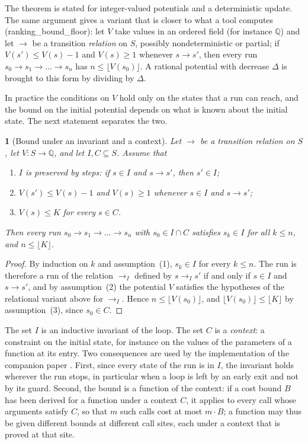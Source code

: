 \documentclass[oneside,english]{amsart}
\numberwithin{equation}{section}
\numberwithin{figure}{section}
\theoremstyle{plain}
\theoremstyle{definition}
\theoremstyle{plain}
\newtheorem{prop}[thm]{\protect\propositionname}
\theoremstyle{remark}
\theoremstyle{plain}
\theoremstyle{definition}
\theoremstyle{plain}
\theoremstyle{remark}
\newcommand{\lean}[1]{{\ttfamily\small #1}}
\providecommand{\propositionname}{Proposition}
\begin{document}
The theorem is stated for integer-valued potentials and a deterministic update. The same argument gives a variant that is closer to what a tool computes (\lean{ranking\_\allowbreak bound\_\allowbreak floor}): let $V$ take values in an ordered field (for instance $\mathbb{Q}$) and let $\to$ be a transition \emph{relation} on $S$, possibly nondeterministic or partial; if $V(s') \le V(s) - 1$ and $V(s) \ge 1$ whenever $s \to s'$, then every run $s_0 \to s_1 \to \dots \to s_n$ has $n \le \lfloor V(s_0) \rfloor$. A rational potential with decrease $\Delta$ is brought to this form by dividing by $\Delta$.

In practice the conditions on $V$ hold only on the states that a run can reach, and the bound on the initial potential depends on what is known about the initial state. The next statement separates the two.

\begin{prop}[Bound under an invariant and a context]
\label{prop:context-bound}
Let $\to$ be a transition relation on $S$, let $V : S \to \mathbb{Q}$, and let $I, C \subseteq S$. Assume that
\begin{enumerate}
    \item $I$ is preserved by steps: if $s \in I$ and $s \to s'$, then $s' \in I$;
    \item $V(s') \le V(s) - 1$ and $V(s) \ge 1$ whenever $s \in I$ and $s \to s'$;
    \item $V(s) \le K$ for every $s \in C$.
\end{enumerate}
Then every run $s_0 \to s_1 \to \dots \to s_n$ with $s_0 \in I \cap C$ satisfies $s_k \in I$ for all $k \le n$, and $n \le \lfloor K \rfloor$.
\end{prop}

\begin{proof}
By induction on $k$ and assumption~(1), $s_k \in I$ for every $k \le n$. The run is therefore a run of the relation $\to_I$ defined by $s \to_I s'$ if and only if $s \in I$ and $s \to s'$, and by assumption~(2) the potential $V$ satisfies the hypotheses of the relational variant above for $\to_I$. Hence $n \le \lfloor V(s_0) \rfloor$, and $\lfloor V(s_0) \rfloor \le \lfloor K \rfloor$ by assumption~(3), since $s_0 \in C$.
\end{proof}

The set $I$ is an inductive invariant of the loop. The set $C$ is a \emph{context}: a constraint on the initial state, for instance on the values of the parameters of a function at its entry. Two consequences are used by the implementation of the companion paper \cite{crosscheckTool}. First, since every state of the run is in $I$, the invariant holds wherever the run stops, in particular when a loop is left by an early exit and not by its guard. Second, the bound is a function of the context: if a cost bound $B$ has been derived for a function under a context $C$, it applies to every call whose arguments satisfy $C$, so that $m$ such calls cost at most $m \cdot B$; a function may thus be given different bounds at different call sites, each under a context that is proved at that site.
\end{document}
